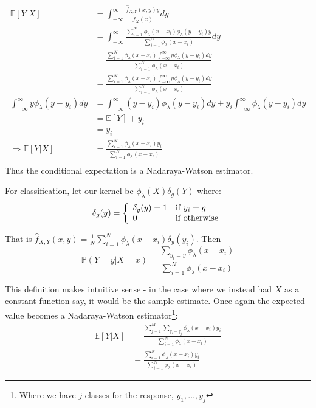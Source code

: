 \begin{align*}
    \mathbb{E}\left[Y\vert X\right] 
    &= \int_{-\infty}^\infty \frac{\hat{f}_{X,Y}(x,y) y}{\hat{f}_{X}(x)} dy \\
    &= \int_{-\infty}^\infty \frac{\sum_{i=1}^N \phi_\lambda(x-x_i)\phi_\lambda(y-y_i) y }{\sum_{i=1}^N \phi_\lambda(x-x_i)} dy  \\
    &= \frac{\sum_{i=1}^N \phi_\lambda(x-x_i)\int_{-\infty}^\infty y \phi_\lambda(y-y_i)  dy} {\sum_{i=1}^N  \phi_\lambda(x-x_i)}\\
    &= \frac{\sum_{i=1}^N \phi_\lambda(x-x_i)\int_{-\infty}^\infty y \phi_\lambda(y-y_i)  dy} {\sum_{i=1}^N  \phi_\lambda(x-x_i)}\\
    \int_{-\infty}^\infty y \phi_\lambda(y-y_i)  dy
    &= \int_{-\infty}^\infty (y-y_i) \phi_\lambda(y-y_i)  dy + y_i \int_{-\infty}^\infty  \phi_\lambda(y-y_i)  dy \\
    &=  \mathbb{E}\left[Y\right]  + y_i \\
    &= y_i \\
\Rightarrow  \mathbb{E}\left[Y\vert X\right] &=\frac{\sum_{i=1}^N \phi_\lambda(x-x_i) y_i} {\sum_{i=1}^N  \phi_\lambda(x-x_i)}\\
\end{align*}
Thus the conditional expectation is a Nadaraya-Watson estimator.

For classification, let our kernel be $\phi_\lambda(X)\delta_g(Y)$ where:
$$\delta_g(y) = \left\{ \begin{array}{ll} \delta_g(y) = 1 & \mbox{if } y_i = g \\ 0 & \mbox{if } \text{otherwise} \end{array} \right.$$

That is $\hat{f}_{X, Y}(x,y) = \frac{1}{N} \sum_{i=1}^N \phi_\lambda(x-x_i) \delta_y(y_i)$. 
Then 
$$\mathbb{P}(Y=y|X=x) = \frac{\sum_{y_i=y} \phi_\lambda(x-x_i)} {\sum_{i=1}^N \phi_\lambda(x-x_i)}$$

This definition makes intuitive sense - in the case where we instead had $X$ as a constant function say, it would be the sample estimate. Once again the expected value becomes a Nadaraya-Watson estimator\footnote{Where we have $j$ classes for the response, $y_1, \dots, y_j$}:
\begin{align*}
    \mathbb{E}\left[Y\vert X\right] 
    &= \frac{\sum_{j = 1}^M \sum_{y_i=y_j} \phi_\lambda(x-x_i) y_i} {\sum_{i=1}^N \phi_\lambda(x-x_i)} \\
    &= \frac{\sum_{i = 1}^N \phi_\lambda(x-x_i) y_i} {\sum_{i=1}^N \phi_\lambda(x-x_i)} 
\end{align*}
